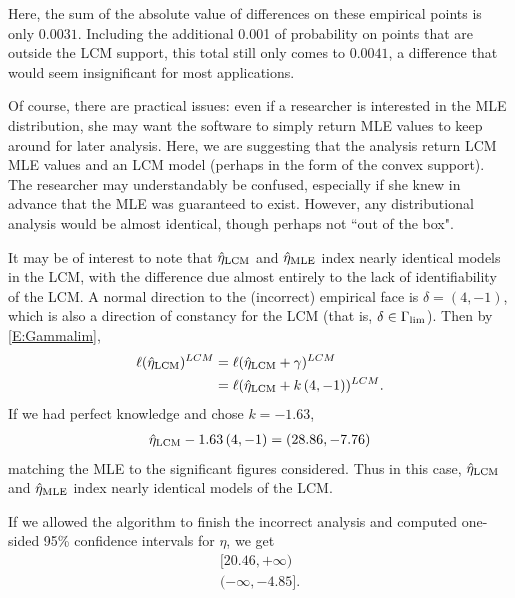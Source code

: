 Here, the sum of the absolute value of differences on these empirical points is only 
$0.0031$.  Including the additional 0.001 of probability on points that are outside 
the LCM support, this total still only comes to $0.0041$, a difference that would seem 
insignificant for most applications.  

Of course, there are practical issues: even if a researcher is interested in the 
MLE distribution, she may want the software to simply 
return MLE values to keep around for later analysis.  Here, we are suggesting that the 
analysis return LCM MLE values and an LCM model (perhaps in the form of the convex 
support).  The researcher may understandably be confused, especially if she knew in 
advance that the MLE was guaranteed to exist.  However, any distributional analysis 
would be almost identical, though perhaps not ``out of the box".

It may be of interest to note that $\hat{\eta}_{\textrm{LCM}}$ and $\hat{\eta}_{\textrm{MLE}}$ index nearly identical 
models in the LCM, with the difference due almost entirely to the lack of 
identifiability of the LCM.  A normal direction to the (incorrect) empirical face is 
$\delta = (4,-1)$, which is also a direction of constancy for the LCM 
(that is, $\delta \in \Gamma_{\textrm{lim}}$).  Then by \eqref{E:Gammalim}, 
\begin{align*}
	\ell(\hat{\eta}_{\textrm{LCM}})^{LCM} &= \ell( \hat{\eta}_{\textrm{LCM}} + \gamma )^{LCM}\\
				 &= 	\ell(\hat{\eta}_{\textrm{LCM}} + k \, (4,-1))^{LCM}.
\end{align*}
If we had perfect knowledge and chose $k = -1.63$,
\begin{align*}
	\hat{\eta}_{\textrm{LCM}}  -1.63 \, (4,-1)= (28.86, -7.76) 
\end{align*}
matching the MLE to the significant figures considered.  Thus in this case, $\hat{\eta}_{\textrm{LCM}}$ 
and $\hat{\eta}_{\textrm{MLE}}$ index nearly identical models of the LCM.

If we allowed the algorithm to finish the incorrect analysis and computed 
one-sided 95\% confidence intervals for $\eta$, we get 
\begin{align*}
	[20.46, +\infty)\\
	(-\infty, -4.85].
\end{align*}


